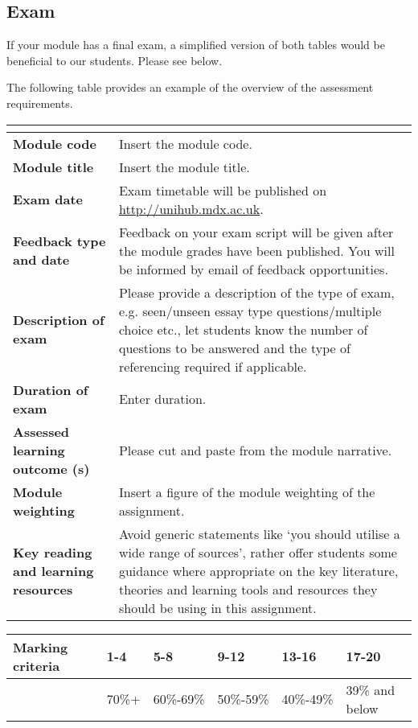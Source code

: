 \documentclass{MDXHandbook}
\begin{document}

\newpage
\begin{landscape}
	\subsection{Exam}
	If your module has a final exam, a simplified version of both tables would be beneficial to our students. Please see below.
	
	The following table provides an example of the overview of the assessment requirements.
	
	\begin{tabular}{|>{\bfseries}p{.35\linewidth}|p{.57\linewidth}|}
		\rowcolor{MDXCorporateRed}\hline 
		\multicolumn{2}{|c|}{\textcolor{white}{Example --- Assessment brief presentation}}\\
		\hline
		Module code & Insert the module code.\\ \hline
		Module title & Insert the module title.\\\hline
		Exam date & Exam timetable will be published on \url{http://unihub.mdx.ac.uk}. \\\hline
		Feedback type and date  & Feedback on your exam script will be given after the module grades have been published. You will be informed by email of feedback opportunities.\\\hline
		Description of exam & Please provide a description of the type of exam, e.g. seen/unseen essay type questions/multiple choice etc., let students know the number of questions to be answered and the type of referencing required if applicable.\\\hline
		Duration of exam & Enter duration.\\\hline
		Assessed learning outcome (s) & Please cut and paste from the module narrative.\\\hline
		Module weighting  & Insert a figure of the module weighting of the assignment.\\\hline
		Key reading and learning resources & Avoid generic statements like ‘you should utilise a wide range of sources’, rather offer students some guidance where appropriate on the key literature, theories and learning tools and resources they should be using in this assignment. \\
		\hline
	\end{tabular}

	\begin{tabular}{|p{.35\linewidth}|p{.1\linewidth}|p{.1\linewidth}|p{.1\linewidth}|p{.1\linewidth}|p{.1\linewidth}|}
	\hline
	Marking criteria & 1-4 & 5-8 & 9-12 & 13-16 & 17-20 \\\hline
			& 70\%+ & 60\%-69\% & 50\%-59\% & 40\%-49\% & 39\% and below
		\\\hline	
	\end{tabular}
\end{landscape}
\end{document}
